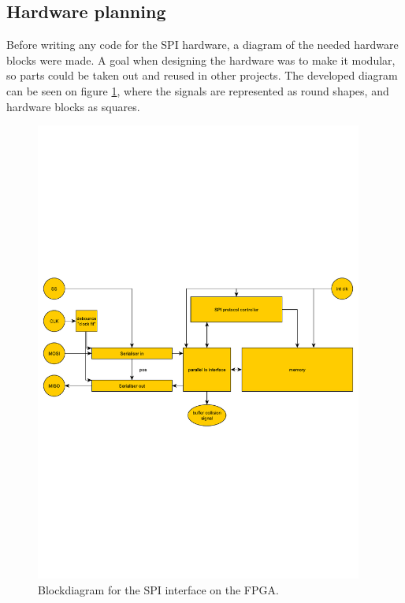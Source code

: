 \subsection{Hardware planning}
Before writing any code for the SPI hardware, a diagram of the needed hardware blocks were made. A goal when designing the hardware was to make it modular, so parts could be taken out and reused in other projects. The developed diagram can be seen on figure \ref{fig:spi_protocol_fpga_blocks_final_design}, where the signals are represented as round shapes, and hardware blocks as squares. 

\begin{figure}[htb] 
	\centering
  \includegraphics[width=0.96\textwidth,clip,trim=0 270 0 270]{graphics/spi_protocol_fpga_blocks_final_design.pdf}%
	\caption{Blockdiagram for the SPI interface on the FPGA.}
	\label{fig:spi_protocol_fpga_blocks_final_design}			%
\end{figure}

